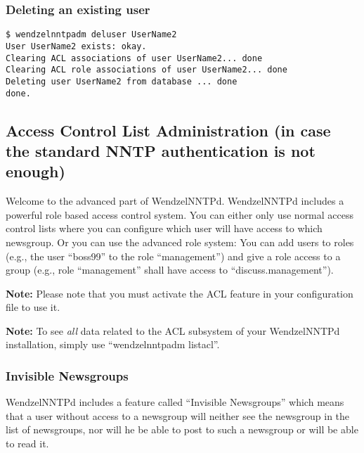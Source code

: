 \documentclass[12pt,fleqn,leqno]{scrbook}
\begin{document}
\hypertarget{deleting-an-existing-user-1}{%
\subsubsection{Deleting an existing
user}\label{deleting-an-existing-user-1}}

\begin{verbatim}
$ wendzelnntpadm deluser UserName2
User UserName2 exists: okay.
Clearing ACL associations of user UserName2... done
Clearing ACL role associations of user UserName2... done
Deleting user UserName2 from database ... done
done.
\end{verbatim}

\hypertarget{access-control-list-administration-in-case-the-standard-nntp-authentication-is-not-enough-1}{%
\subsection{Access Control List Administration (in case the standard
NNTP authentication is not
enough)}\label{access-control-list-administration-in-case-the-standard-nntp-authentication-is-not-enough-1}}

Welcome to the advanced part of WendzelNNTPd. WendzelNNTPd includes a
powerful role based access control system. You can either only use
normal access control lists where you can configure which user will have
access to which newsgroup. Or you can use the advanced role system: You
can add users to roles (e.g., the user ``boss99'' to the role
``management'') and give a role access to a group (e.g., role
``management'' shall have access to ``discuss.management'').

\textbf{Note:} Please note that you must activate the ACL feature in
your configuration file to use it.

\textbf{Note:} To see \emph{all} data related to the ACL subsystem of
your WendzelNNTPd installation, simply use ``wendzelnntpadm listacl''.

\hypertarget{invisible-newsgroups-1}{%
\subsubsection{Invisible Newsgroups}\label{invisible-newsgroups-1}}

WendzelNNTPd includes a feature called ``Invisible Newsgroups'' which
means that a user without access to a newsgroup will neither see the
newsgroup in the list of newsgroups, nor will he be able to post to such
a newsgroup or will be able to read it.
\end{document}
